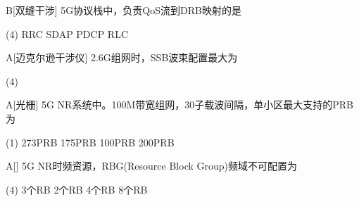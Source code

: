 \begin{choice}{B}[双缝干涉]
    5G协议栈中，负责QoS流到DRB映射的是
    \begin{tasks}(4)
        \task RRC
        \task SDAP
        \task PDCP
        \task RLC
    \end{tasks}
\end{choice}


\begin{choice}{A}[迈克尔逊干涉仪]
    2.6G组网时，SSB波束配置最大为
    \begin{tasks}(4)
    \end{tasks}
\end{choice}


\begin{choice}{A}[光栅]
    5G NR系统中。100M带宽组网，30子载波间隔，单小区最大支持的PRB为
    \begin{tasks}(1)
        \task 273PRB
        \task 175PRB
        \task 100PRB
        \task 200PRB
    \end{tasks}
\end{choice}

\begin{choice}{A}[]
    5G NR时频资源，RBG(Resource Block Group)频域不可配置为
    \begin{tasks}(4)
        \task 3个RB
        \task 2个RB
        \task 4个RB
        \task 8个RB
    \end{tasks}
\end{choice}


